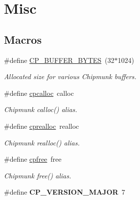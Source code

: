 \hypertarget{group__misc}{}\section{Misc}
\label{group__misc}
\subsection*{Macros}
\begin{DoxyCompactItemize}
\item 
\mbox{\label{group__misc_ga6d034fec4d7962b6f20f9e243527c560}} 
\#define \hyperlink{group__misc_ga6d034fec4d7962b6f20f9e243527c560}{C\+P\+\_\+\+B\+U\+F\+F\+E\+R\+\_\+\+B\+Y\+T\+ES}~(32$\ast$1024)
\begin{DoxyCompactList}\small\item\em Allocated size for various Chipmunk buffers. \end{DoxyCompactList}\item 
\mbox{\label{group__misc_gac88bab87ecc7db6cc222679bf6082e9b}} 
\#define \hyperlink{group__misc_gac88bab87ecc7db6cc222679bf6082e9b}{cpcalloc}~calloc
\begin{DoxyCompactList}\small\item\em Chipmunk calloc() alias. \end{DoxyCompactList}\item 
\mbox{\label{group__misc_gab3544b888840ed34e49bb0559d6849a8}} 
\#define \hyperlink{group__misc_gab3544b888840ed34e49bb0559d6849a8}{cprealloc}~realloc
\begin{DoxyCompactList}\small\item\em Chipmunk realloc() alias. \end{DoxyCompactList}\item 
\mbox{\label{group__misc_ga14627263deb67605201281bac734eb04}} 
\#define \hyperlink{group__misc_ga14627263deb67605201281bac734eb04}{cpfree}~free
\begin{DoxyCompactList}\small\item\em Chipmunk free() alias. \end{DoxyCompactList}\item 
\mbox{\label{group__misc_gac02132b57a51a1c26ff6fb11dc046c04}} 
\#define {\bfseries C\+P\+\_\+\+V\+E\+R\+S\+I\+O\+N\+\_\+\+M\+A\+J\+OR}~7

\end{DoxyCompactItemize}
